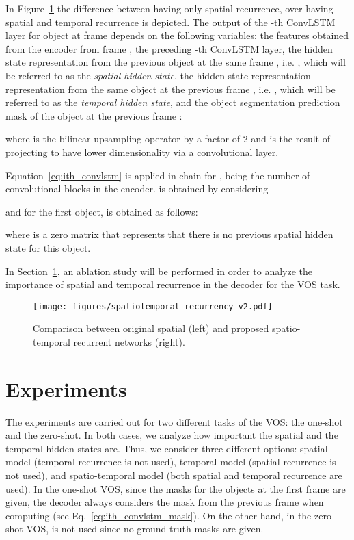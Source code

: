 \documentclass[10pt,twocolumn,letterpaper]{article}
\begin{document}
In Figure~\ref{fig:spatiotemporal-decoder} the difference between having only spatial recurrence, over having spatial and temporal recurrence is depicted. 
The output  of the -th ConvLSTM layer for object  at frame  depends on the following variables:  the features  obtained from the encoder from frame ,  the preceding -th ConvLSTM layer,  the hidden state representation from the previous object  at the same frame , i.e. , which will be referred to as the \emph{spatial hidden state},  the hidden state representation representation from the same object  at the previous frame , i.e. , which will be referred to as the \emph{temporal hidden state}, and  the object segmentation prediction mask  of the object  at the previous frame :


where  is the bilinear upsampling operator by a factor of 2 and  is the result of projecting  to have lower dimensionality via a convolutional layer.

Equation~\ref{eq:ith_convlstm} is applied in chain for , being  the number of convolutional blocks in the encoder.  is obtained by considering


and for the first object,  is obtained as follows:


where  is a zero matrix that represents that there is no previous spatial hidden state for this object.

In Section~\ref{sec:experiments}, an ablation study will be performed in order to analyze the importance of spatial and temporal recurrence in the decoder for the VOS task.

\begin{figure}

  \centering
  \texttt{[image: figures/spatiotemporal-recurrency\_v2.pdf]}
\caption{Comparison between original spatial \cite{Salvador17} (left) and proposed spatio-temporal recurrent networks (right).}
  \label{fig:spatiotemporal-decoder}
\end{figure}



 \section{Experiments}
\label{sec:experiments}

The experiments are carried out for two different tasks of the VOS: the one-shot and the zero-shot. In both cases, we analyze how important the spatial and the temporal hidden states are. Thus, we consider three different options:  spatial model (temporal recurrence is not used),  temporal model (spatial recurrence is not used), and  spatio-temporal model (both spatial and temporal recurrence are used). In the one-shot VOS, since the masks for the objects at the first frame are given, the decoder always considers the mask  from the previous frame when computing  (see Eq.~\ref{eq:ith_convlstm_mask}). On the other hand, in the zero-shot VOS,  is not used since no ground truth masks are given.
\end{document}
